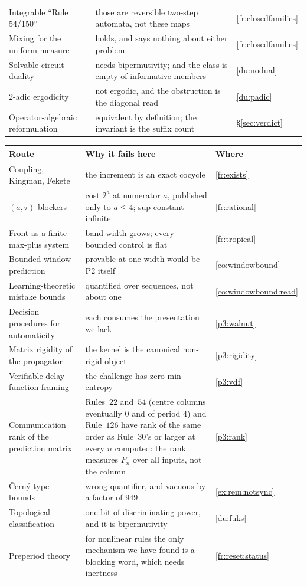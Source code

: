 \documentclass[11pt]{article}
\theoremstyle{definition}
\theoremstyle{remark}
\begin{document}
\begin{tabular}{@{}p{}p{}l@{}}
Integrable ``Rule 54/150'' & those are reversible two-step automata, not these maps & \ref{fr:closedfamilies}\\
Mixing for the uniform measure & holds, and says nothing about either problem & \ref{fr:closedfamilies}\\
Solvable-circuit duality & needs bipermutivity; and the class is empty of informative members & \ref{du:nodual}\\
$2$-adic ergodicity & not ergodic, and the obstruction is the diagonal read & \ref{du:padic}\\
Operator-algebraic reformulation & equivalent by definition; the invariant is the suffix count & \S\ref{sec:verdict}\\
\hline
\end{tabular}

\noindent\begin{tabular}{@{}p{}p{}l@{}}
\hline
\textbf{Route} & \textbf{Why it fails here} & \textbf{Where} \\
\hline
Coupling, Kingman, Fekete & the increment is an exact cocycle & \ref{fr:exists}\\
$(a,\tau)$-blockers & cost $2^{a}$ at numerator $a$, published only to $a\le4$; sup constant infinite & \ref{fr:rational}\\
Front as a finite max-plus system & band width grows; every bounded control is flat & \ref{fr:tropical}\\
Bounded-window prediction & provable at one width would be P2 itself & \ref{co:windowbound}\\
Learning-theoretic mistake bounds & quantified over sequences, not about one & \ref{co:windowbound:read}\\
Decision procedures for automaticity & each consumes the presentation we lack & \ref{p3:walnut}\\
Matrix rigidity of the propagator & the kernel is the canonical non-rigid object & \ref{p3:rigidity}\\
Verifiable-delay-function framing & the challenge has zero min-entropy & \ref{p3:vdf}\\
Communication rank of the prediction matrix & Rules~$22$ and~$54$ (centre columns eventually $0$ and of period $4$) and Rule~$126$ have rank of the same order as Rule~30's or larger at every $n$ computed: the rank measures $F_n$ over all inputs, not the column & \ref{p3:rank}\\
\v{C}ern\'y-type bounds & wrong quantifier, and vacuous by a factor of $949$ & \ref{ex:rem:notsync}\\
Topological classification & one bit of discriminating power, and it is bipermutivity & \ref{du:fuks}\\
Preperiod theory & for nonlinear rules the only mechanism we have found is a blocking word, which needs inertness & \ref{fr:reset:status}\\
\hline
\end{tabular}
\medskip
\end{document}
